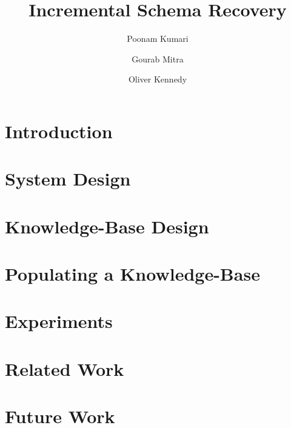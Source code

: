 \documentclass[sigconf]{acmart}
\begin{document}
\title{Incremental Schema Recovery}


\author{Poonam Kumari}

\author{Gourab Mitra}

\author{Oliver Kennedy}


\renewcommand{\shortauthors}{Kumari et al.}


\begin{abstract}

\end{abstract}

%
%


\maketitle

\section{Introduction}
\label{sec:introduction}


\section{System Design}
\label{sec:system}


\section{Knowledge-Base Design}
\label{sec:knowledgebase}


\section{Populating a Knowledge-Base}
\label{sec:expertui}


\section{Experiments}
\label{sec:experiments}


\section{Related Work}
\label{sec:related}
 

\section{Future Work}
\label{sec:future}




\end{document}
